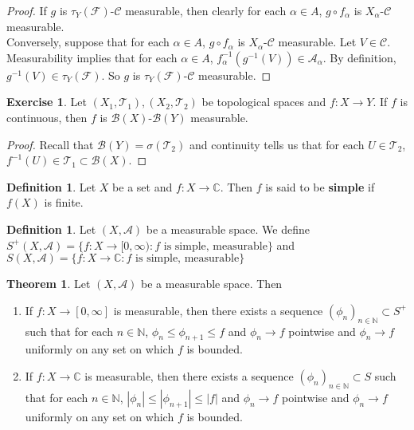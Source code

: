 \documentclass{book}
\theoremstyle{definition}
\newtheorem{defn}[definition]{Definition}
\newtheorem{thm}[definition]{Theorem}
\newtheorem{ex}[definition]{Exercise}
\newcommand{\al}{\alpha}
\newcommand{\sig}{\sigma}
\newcommand{\C}{\mathbb{C}}
\newcommand{\N}{\mathbb{N}}
\newcommand{\MA}{\mathcal{A}}
\newcommand{\MB}{\mathcal{B}}
\newcommand{\MC}{\mathcal{C}}
\newcommand{\MF}{\mathcal{F}}
\newcommand{\MT}{\mathcal{T}}
\newcommand{\lex}[1]{\label{ex:#1}}
\newcommand{\ld}[1]{\label{defn:#1}}
\DeclareMathOperator*{\0}{\mbf{0}}
\DeclareMathOperator*{\1}{\mbf{1}}
\newcommand{\RG}{[0,\infty]}
\newcommand{\Rg}{[0,\infty)}
\begin{document}
	\begin{proof}
		If $g$ is $\tau_Y(\MF)$-$\MC$ measurable, then clearly for each $\al \in A$, $g \circ f_{\al}$ is $X_{\al}$-$\MC$ measurable. \\
		Conversely, suppose that for each $\al \in A$, $g \circ f_{\al}$ is $X_{\al}$-$\MC$ measurable. Let $V \in \MC$. Measurability implies that for each $\al \in A$, $f_{\al}^{-1}(g^{-1}(V)) \in \MA_{\al}$. By definition, $g^{-1}(V) \in \tau_Y(\MF)$. So $g$ is $\tau_Y(\MF)$-$\MC$ measurable.
	\end{proof}
	
	\begin{ex} \lex{00000} 
		Let $(X_1,\MT_1), (X_2,\MT_2)$ be topological spaces and $f: X \rightarrow Y$. If $f$ is continuous, then $f$ is $\MB(X)$-$\MB(Y)$ measurable.
	\end{ex}
	
	\begin{proof}
		Recall that $\MB(Y) = \sig(\MT_2)$ and continuity tells us that for each $U \in \MT_2$, $f^{-1}(U) \in \MT_1 \subset \MB(X)$. 
	\end{proof}
	
	\begin{defn} \ld{00000} 
		Let $X$ be a set and $f:X \rightarrow \C$. Then $f$ is said to be \textbf{simple} if $f(X)$ is finite.
	\end{defn}
	
	\begin{defn} \ld{00000} 
		Let $(X,\MA)$ be a measurable space. We define $S^+(X,\MA) = \{f:X \rightarrow \Rg: f \text{ is simple, measurable}\}$ and $S(X,\MA) = \{f: X \rightarrow \C: f \text{ is simple, measurable}\}$
	\end{defn}
	
	\begin{thm}
		Let $(X, \MA)$ be a measurable space. Then 
		\begin{enumerate}
			\item If $f: X \rightarrow \RG$ is measurable, then there exists a sequence $(\phi_n)_{n \in \N} \subset S^+$ such that for each $n \in \N$, $\phi_n \leq \phi_{n+1} \leq f$ and $\phi_n \rightarrow f$ pointwise and $\phi_n \rightarrow f$ uniformly on any set on which $f$ is bounded.
			
			\item If $f: X \rightarrow \C$ is measurable, then there exists a sequence $(\phi_n)_{n \in \N} \subset S$ such that for each $n \in \N$, $|\phi_n| \leq |\phi_{n+1}| \leq |f|$ and $\phi_n \rightarrow f$ pointwise and $\phi_n \rightarrow f$ uniformly on any set on which $f$ is bounded.
		\end{enumerate}
	\end{thm}
	
\end{document}
